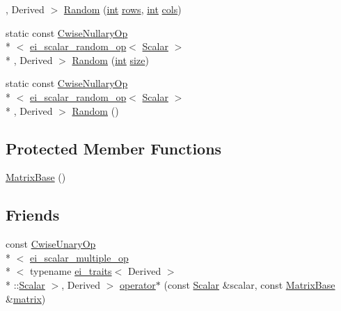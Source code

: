 \begin{DoxyCompactItemize}
, Derived $>$ \hyperlink{class_matrix_base_a84d2e57e9a2a4474edbefdeae7a1f9e6}{Random} (\hyperlink{ioapi_8h_a787fa3cf048117ba7123753c1e74fcd6}{int} \hyperlink{class_matrix_base_ae82810ba95da637cdf434b4274083723}{rows}, \hyperlink{ioapi_8h_a787fa3cf048117ba7123753c1e74fcd6}{int} \hyperlink{class_matrix_base_abe5381b539f87237647bc651a1ac0364}{cols})
\item 
static const \hyperlink{class_cwise_nullary_op}{Cwise\-Nullary\-Op}\\*
$<$ \hyperlink{structei__scalar__random__op}{ei\-\_\-scalar\-\_\-random\-\_\-op}$<$ \hyperlink{class_matrix_base_a625df8339dc2d816cbc0fd66e7dadaf5}{Scalar} $>$\\*
, Derived $>$ \hyperlink{class_matrix_base_a393230864cd14902296a1e4738f429c7}{Random} (\hyperlink{ioapi_8h_a787fa3cf048117ba7123753c1e74fcd6}{int} \hyperlink{glext_8h_a014d89bd76f74ef3a29c8f04b473eb76}{size})
\item 
static const \hyperlink{class_cwise_nullary_op}{Cwise\-Nullary\-Op}\\*
$<$ \hyperlink{structei__scalar__random__op}{ei\-\_\-scalar\-\_\-random\-\_\-op}$<$ \hyperlink{class_matrix_base_a625df8339dc2d816cbc0fd66e7dadaf5}{Scalar} $>$\\*
, Derived $>$ \hyperlink{class_matrix_base_afaba6ac3461ed7f6bcdb2c877bc62b93}{Random} ()
\end{DoxyCompactItemize}
\subsection*{Protected Member Functions}
\begin{DoxyCompactItemize}
\item 
\hyperlink{class_matrix_base_aa0151edf82e506302244fe03536ffae0}{Matrix\-Base} ()
\end{DoxyCompactItemize}
\subsection*{Friends}
\begin{DoxyCompactItemize}
\item 
const \hyperlink{class_cwise_unary_op}{Cwise\-Unary\-Op}\\*
$<$ \hyperlink{structei__scalar__multiple__op}{ei\-\_\-scalar\-\_\-multiple\-\_\-op}\\*
$<$ typename \hyperlink{structei__traits}{ei\-\_\-traits}$<$ Derived $>$\\*
\-::\hyperlink{class_matrix_base_a625df8339dc2d816cbc0fd66e7dadaf5}{Scalar} $>$, Derived $>$ \hyperlink{class_matrix_base_a2e1af96a2e534ace0776ddb297c8de0b}{operator$\ast$} (const \hyperlink{class_matrix_base_a625df8339dc2d816cbc0fd66e7dadaf5}{Scalar} \&scalar, const \hyperlink{class_matrix_base}{Matrix\-Base} \&\hyperlink{glext_8h_a7b24a3f2f56eb1244ae69dacb4fecb6f}{matrix})
\end{DoxyCompactItemize}
